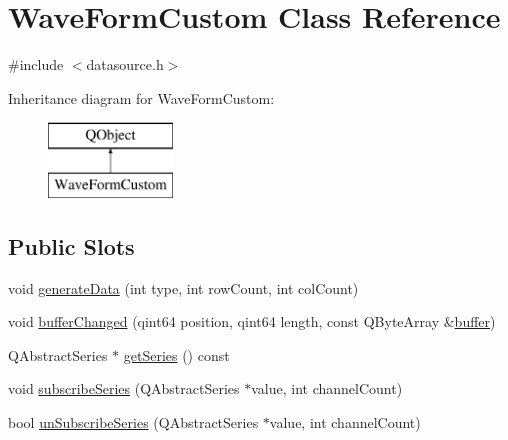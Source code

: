 \hypertarget{class_wave_form_custom}{}\section{Wave\+Form\+Custom Class Reference}
\label{class_wave_form_custom}


{\ttfamily \#include $<$datasource.\+h$>$}

Inheritance diagram for Wave\+Form\+Custom\+:\begin{figure}[H]
\begin{center}
\leavevmode
\includegraphics[height=2.000000cm]{class_wave_form_custom}
\end{center}
\end{figure}
\subsection*{Public Slots}
\begin{DoxyCompactItemize}
\item 
void \hyperlink{class_wave_form_custom_ab69bdeeb043d9304d19723e4b35c2f33}{generate\+Data} (int type, int row\+Count, int col\+Count)
\item 
void \hyperlink{class_wave_form_custom_a78ba2270b3d08781fac5de6b39cb3a53}{buffer\+Changed} (qint64 position, qint64 length, const Q\+Byte\+Array \&\hyperlink{class_wave_form_custom_a90fb1825e9929177cf5e034a464e4e24}{buffer})
\item 
Q\+Abstract\+Series $\ast$ \hyperlink{class_wave_form_custom_a76683067d578c13b6f5141c74590a746}{get\+Series} () const
\item 
void \hyperlink{class_wave_form_custom_ac6c2dbc11bd5789cee99674077307799}{subscribe\+Series} (Q\+Abstract\+Series $\ast$value, int channel\+Count)
\item 
bool \hyperlink{class_wave_form_custom_a51bbb3f0a646f2fbac70617cad686d75}{un\+Subscribe\+Series} (Q\+Abstract\+Series $\ast$value, int channel\+Count)
\end{DoxyCompactItemize}
